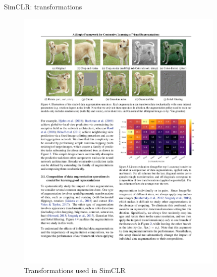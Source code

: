 \documentclass[xcolor=pdftex,dvipsnames,table]{beamer}
\begin{document}
\begin{frame}{SimCLR: transformations}
\begin{figure}[htb]
   \centering
   \includegraphics[width=0.9\textwidth]{../graphics/simclr_transformations.pdf}
   \caption{Transformations used in SimCLR \cite{Chen2020}}
\end{figure}
\end{frame}
\end{document}
